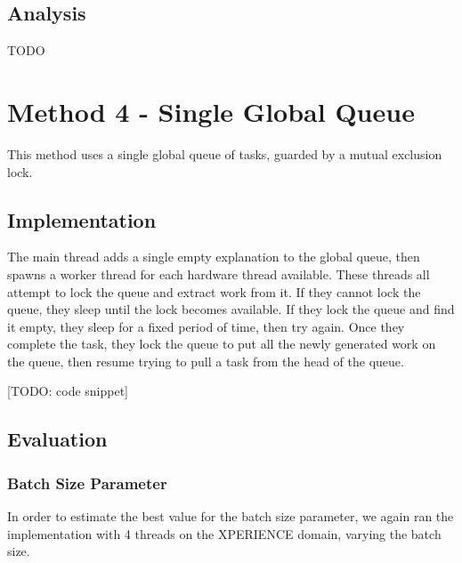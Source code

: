 \documentclass[12pt,twoside,abbrevs,msc,ai,notimes,logo,sansheadings]{infthesis}
\begin{document}
  \section{Analysis}
  TODO
  
  \chapter {Method 4 - Single Global Queue}
  
  This method uses a single global queue of tasks, guarded by a mutual exclusion lock.
  
  \section {Implementation}
  
  The main thread adds a single empty explanation to the global queue, then spawns a worker thread for each hardware thread available. These threads all attempt to lock the queue and extract work from it. If they cannot lock the queue, they sleep until the lock becomes available. If they lock the queue and find it empty, they sleep for a fixed period of time, then try again. Once they complete the task, they lock the queue to put all the newly generated work on the queue, then resume trying to pull a task from the head of the queue.
  
  [TODO: code snippet]
  
  \section{Evaluation}
  
  \subsection{Batch Size Parameter}
  
  In order to estimate the best value for the batch size parameter, we again ran the implementation with 4 threads on the XPERIENCE domain, varying the batch size.
  
\end{document}
